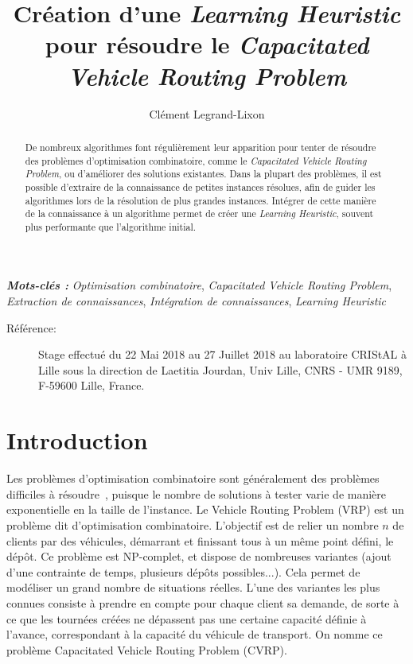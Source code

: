 \documentclass[a4paper,11pt]{article}%
\providecommand{\keywords}[1]{\textbf{\textit{Mots-clés : }} #1}
\begin{document}
\title{Création d'une \emph{Learning Heuristic} pour résoudre le \emph{Capacitated Vehicle Routing Problem}}

\author{Clément Legrand-Lixon}

\maketitle

\begin{abstract}
De nombreux algorithmes font régulièrement leur apparition pour tenter de résoudre des problèmes d'optimisation combinatoire, comme le \emph{Capacitated Vehicle Routing Problem}, ou d'améliorer des solutions existantes.
Dans la plupart des problèmes, il est possible d'extraire de la connaissance de petites instances résolues, afin de guider les algorithmes lors de la résolution de plus grandes instances. Intégrer de cette manière de la connaissance à un algorithme permet de créer une \emph{Learning Heuristic}, souvent plus performante que l'algorithme initial. 
\end{abstract}

\keywords{\emph{Optimisation combinatoire}, \emph{Capacitated Vehicle Routing Problem}, \emph{Extraction de connaissances}, \emph{Intégration de connaissances}, \emph{Learning Heuristic}}

\begin{description}
\item[Référence:] Stage effectué du 22 Mai 2018 au 27 Juillet 2018 au laboratoire CRIStAL à Lille sous la direction de Laetitia Jourdan, Univ Lille, CNRS - UMR 9189, F-59600 Lille, France.

\end{description}

\section*{Introduction}

Les problèmes d'optimisation combinatoire sont généralement des problèmes difficiles à résoudre~\cite{Papadimitriou_1982}, puisque le nombre de solutions à tester varie de manière exponentielle en la taille de l'instance. 
Le Vehicle Routing Problem (VRP) est un problème dit d'optimisation combinatoire.
L'objectif est de relier un nombre $n$ de clients par des véhicules, démarrant et finissant tous à un même point défini, le dépôt. 
Ce problème est NP-complet, et dispose de nombreuses variantes (ajout d'une contrainte de temps, plusieurs dépôts possibles...). Cela permet de modéliser un grand nombre de situations réelles. 
L'une des variantes les plus connues consiste à prendre en compte pour chaque client sa demande, de sorte à ce que les tournées créées ne dépassent pas une certaine capacité définie à l'avance, correspondant à la capacité du véhicule de transport. 
On nomme ce problème Capacitated Vehicle Routing Problem (CVRP). 
\end{document}
